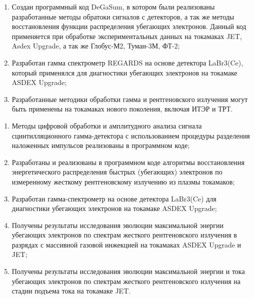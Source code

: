 {\influence}\begin{enumerate}[beginpenalty=10000]
  \item Создан программный код DeGaSum, в котором были реализованы разработанные методы обратоки сигналов с детекторов, а так же методы восстановления функции распределения убегающих электронов. Данный код  применяется при обработке экспериментальных данных на токамаках JET, Asdex Upgrade, а так же Глобус-М2, Туман-3М, ФТ-2;
  \item Разработан гамма спектрометр REGARDS на основе детектора LaBr3(Ce), который применялся для диагностики убегающих электронов на токамаке ASDEX Upgrade;
  \item Разработанные методики обработки гамма и рентгеновского излучения могут быть применены на токамаках нового поколения, включая ИТЭР и ТРТ.
\end{enumerate}


{}
\begin{enumerate}[beginpenalty=10000] %
  \item Методы цифровой обработки и амплитудного анализа сигнала сцинтилляционного гамма-детектора с использованием процедуры разделения наложенных импульсов реализованы в программном коде;
  \item Разработаны и реализованы в программном коде алгоритмы восстановления энергетического распределения быстрых (убегающих) электронов по измеренному жесткому рентгеновскому излучению из плазмы токамаков;
  \item Разработан гамма-спектрометр на основе детектора LaBr3(Ce) для диагностики убегающих электронов на токамаке ASDEX Upgrade;
  \item Получены результаты исследования эволюции максимальной энергии убегающих электронов по спектрам жесткого рентгеновского излучения в разрядах с массивной газовой инжекцией на токамаках ASDEX Upgrade и JET;
  \item Получены результаты исследования эволюции максимальной энергии и тока убегающих электронов по спектрам жесткого рентгеновского излучения на стадии подъема тока на токамаке JET.
\end{enumerate}




